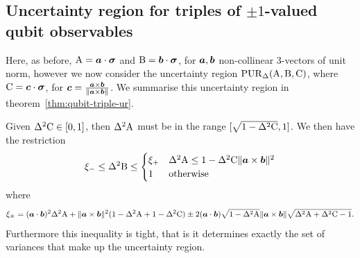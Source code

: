\subsection{Uncertainty region for triples of $\pm 1$-valued qubit observables}
\label{sec:qubit-triple-uncertainty}
Here, as before, $\operatorname{A} = \bm{a}\cdot{\boldsymbol\sigma}$ and $\operatorname{B} = \bm{b}\cdot{\boldsymbol\sigma}$, for $\bm{a}, \bm{b}$ non-collinear 3-vectors of unit norm, however we now consider the uncertainty region ${\mathrm{ PUR}}_\Delta(\operatorname{A},\operatorname{B},\operatorname{C})$, where $\operatorname{C} = \bm{c}\cdot{\boldsymbol\sigma}$, for $\bm{c} = \frac{\bm{a}\times\bm{b}}{\|\bm{a}\times\bm{b}\|}$.
We summarise this uncertainty region in theorem~\ref{thm:qubit-triple-ur}.
\begin{thm}\label{thm:qubit-triple-ur}
  Given $\var{\opc}\in[0,1]$, then $\var{\opa}$ must be in the range $[\sqrt{1-\var{\opc}}, 1]$. We then have the restriction
\begin{align}
  \xi_- \leq \var{\opb}   \leq\begin{cases}\xi_+ & \var{\opa} \leq 1-\var{\opc}\|\boa\times\bob\|^2\\1&\text{otherwise}\end{cases}
\end{align}
where
\begin{align}
  \xi_\pm = (\boa\cdot\bob)^2 \var{\opa} + \|\boa\times\bob\|^2(1-\var{\opa} + 1-\var{\opc}) \pm 2(\boa\cdot\bob)\sqrt{1-\var{\opa}}\|\boa\times\bob\|\sqrt{\var{\opa} + \var{\opc} -1}.
\end{align}
Furthermore this inequality is tight, that is it determines exactly the set of variances that make up the uncertainty region.
\end{thm}

